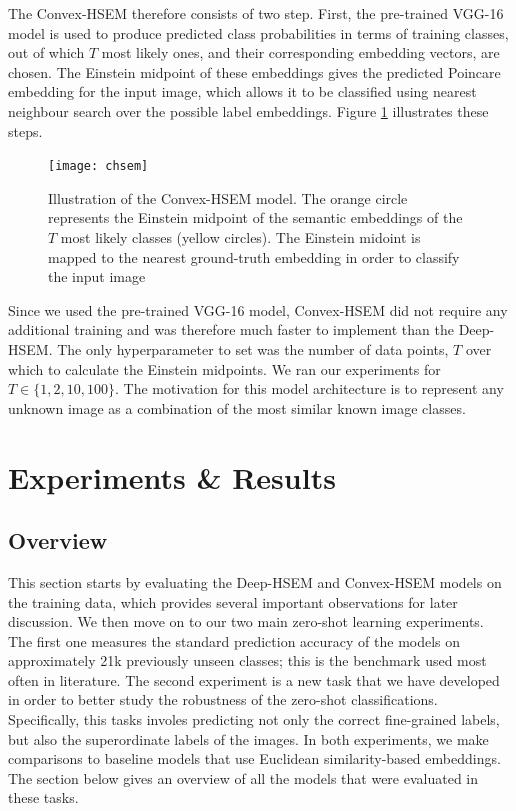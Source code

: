 \documentclass[12pt]{report}
\begin{document}
The Convex-HSEM therefore consists of two step. First, the pre-trained VGG-16 model is used to produce predicted class probabilities in terms of training classes, out of which $T$ most likely ones, and their corresponding embedding vectors, are chosen. The Einstein midpoint of these embeddings gives the predicted Poincare embedding for the input image, which allows it to be classified using nearest neighbour search over the possible label embeddings. Figure \ref{fig:chsem} illustrates these steps. 
\begin{figure}
  \centering
  \texttt{[image: chsem]}
  \caption{Illustration of the Convex-HSEM model. The orange circle represents the Einstein midpoint of the semantic embeddings of the $T$ most likely classes (yellow circles). The Einstein midoint is mapped to the nearest ground-truth embedding in order to classify the input image}
  \label{fig:chsem}
\end{figure}
Since we used the pre-trained VGG-16 model, Convex-HSEM did not require any additional training and was therefore much faster to implement than the Deep-HSEM. The only hyperparameter to set was the number of data points, $T$ over which to calculate the Einstein midpoints. We ran our experiments for 
$T \in \{1, 2, 10, 100\}$. The motivation for this model architecture is to represent any unknown image as a combination of the most similar known image classes. 
\newpage


\chapter{Experiments \& Results}
\section{Overview}
This section starts by evaluating the Deep-HSEM and Convex-HSEM models on the training data, which provides several important observations for later discussion. We then move on to our two main zero-shot learning experiments. The first one measures the standard prediction accuracy of the models on approximately 21k previously unseen classes; this is the benchmark used most often in literature. The second experiment is a new task that we have developed in order to better study the robustness of the zero-shot classifications. Specifically, this tasks involes predicting not only the correct fine-grained labels, but also the superordinate labels of the images. In both experiments, we make comparisons to baseline models that use Euclidean similarity-based embeddings. The section below gives an overview of all the models that were evaluated in these tasks.
\end{document}
